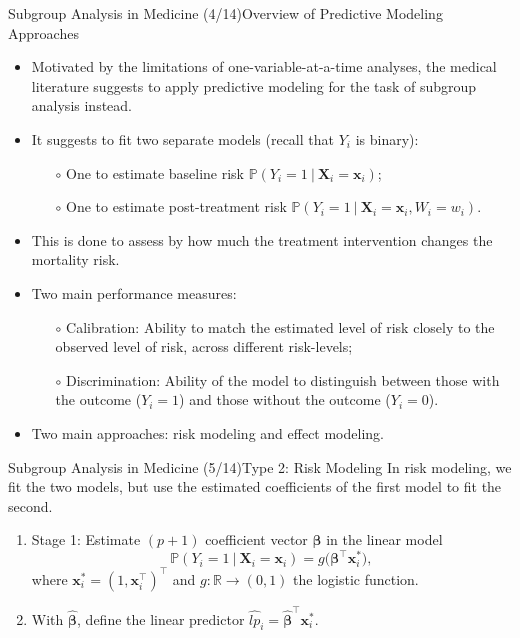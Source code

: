 \documentclass[11pt]{beamer}
\begin{document}
\begin{frame}{Subgroup Analysis in Medicine (4/14)}{Overview of Predictive Modeling Approaches}
\begin{itemize}
	\item Motivated by the limitations of one-variable-at-a-time analyses, the medical literature suggests to apply predictive modeling for the task of subgroup analysis instead.
	\item It suggests to fit two separate models (recall that $Y_i$ is binary):
	\begin{itemize}
		\item[$\circ$] One to estimate baseline risk $\mathbb{P}(Y_i=1\ |\  \mathbf{X}_i = \mathbf{x}_i)$;
		\item[$\circ$] One to estimate post-treatment risk $\mathbb{P}(Y_i=1\ |\ \mathbf{X}_i = \mathbf{x}_i, W_i = w_i)$.
	\end{itemize}	
	\item This is done to assess by how much the treatment intervention changes the mortality risk.
	\item Two main performance measures:
	\begin{itemize}
		\item[$\circ$] \alert{Calibration}: Ability to match the estimated level of risk closely to the observed level of risk, across different risk-levels;
		\item[$\circ$] \alert{Discrimination}: Ability of the model to distinguish between those with the outcome ($Y_i=1$) and those without the outcome ($Y_i = 0$).
	\end{itemize}
	\item Two main approaches: risk modeling and effect modeling.
	\end{itemize}
\end{frame}


\begin{frame}{Subgroup Analysis in Medicine (5/14)}{Type 2: Risk Modeling}
In risk modeling, we fit the two models, but use the estimated coefficients of the first model to fit the second.
\begin{enumerate}
\item Stage 1: Estimate $(p+1)$ coefficient vector $\bm{\beta}$ in the linear model 
\[
	\mathbb{P}(Y_i=1\ |\  \mathbf{X}_i = \mathbf{x}_i)
	=
	g \Big(\bm{\beta}^\top \mathbf{x}_i^* \Big),
\]
where $\mathbf{x}_i^* = (1, \mathbf{x}_i^\top)^\top$ and $g:\mathbb{R}\to (0,1)$ the logistic function.
\item With $\bm{\hat{\beta}}$, define the linear predictor $\hat{lp}_i = \bm{\hat{\beta}}^\top \mathbf{x}_i^*$.
\end{enumerate}
\end{frame}
\end{document}
